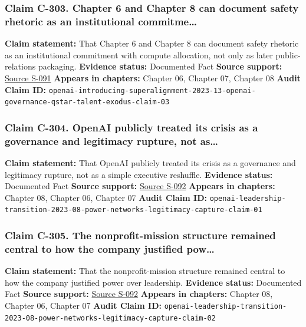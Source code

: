 \documentclass[
  american,
  11pt,
  letterpaper,
]{article}
\begin{document}
\subsubsection{Claim C-303. Chapter 6 and Chapter 8 can document safety
rhetoric as an institutional
commitme\ldots{}}\label{claim-c-303-chapter-6-and-chapter-8-can-document-safety-rhetoric-as-an-institutional-commitme}

\textbf{Claim statement:} That Chapter 6 and Chapter 8 can document
safety rhetoric as an institutional commitment with compute allocation,
not only as later public-relations packaging. \textbf{Evidence status:}
Documented Fact \textbf{Source support:}
\hyperref[source-s-091-introducing-superalignment]{Source S-091}
\textbf{Appears in chapters:} Chapter 06, Chapter 07, Chapter 08
\textbf{Audit Claim ID:}
\texttt{openai-introducing-superalignment-2023-13-openai-governance-qstar-talent-exodus-claim-03}

\subsubsection{Claim C-304. OpenAI publicly treated its crisis as a
governance and legitimacy rupture, not
as\ldots{}}\label{claim-c-304-openai-publicly-treated-its-crisis-as-a-governance-and-legitimacy-rupture-not-as}

\textbf{Claim statement:} That OpenAI publicly treated its crisis as a
governance and legitimacy rupture, not as a simple executive reshuffle.
\textbf{Evidence status:} Documented Fact \textbf{Source support:}
\hyperref[source-s-092-openai-announces-leadership-transition]{Source
S-092} \textbf{Appears in chapters:} Chapter 08, Chapter 06, Chapter 07
\textbf{Audit Claim ID:}
\texttt{openai-leadership-transition-2023-08-power-networks-legitimacy-capture-claim-01}

\subsubsection{Claim C-305. The nonprofit-mission structure remained
central to how the company justified
pow\ldots{}}\label{claim-c-305-the-nonprofit-mission-structure-remained-central-to-how-the-company-justified-pow}

\textbf{Claim statement:} That the nonprofit-mission structure remained
central to how the company justified power over leadership.
\textbf{Evidence status:} Documented Fact \textbf{Source support:}
\hyperref[source-s-092-openai-announces-leadership-transition]{Source
S-092} \textbf{Appears in chapters:} Chapter 08, Chapter 06, Chapter 07
\textbf{Audit Claim ID:}
\texttt{openai-leadership-transition-2023-08-power-networks-legitimacy-capture-claim-02}
\end{document}
